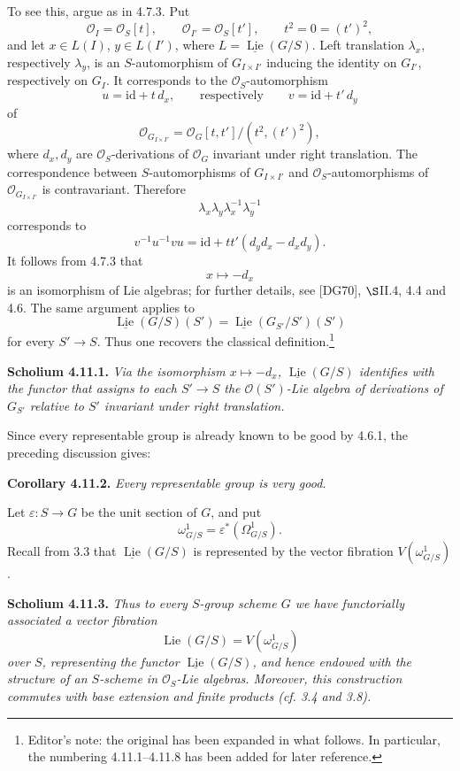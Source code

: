 To see this, argue as in 4.7.3. Put
\[
 \mathcal O_I=\mathcal O_S[t],
 \qquad
 \mathcal O_{I'}=\mathcal O_S[t'],
 \qquad
 t^2=0=(t')^2,
\]
and let \(x\in L(I)\), \(y\in L(I')\), where
\(L=\underline{\operatorname{Lie}}(G/S)\). Left translation
\(\lambda_x\), respectively \(\lambda_y\), is an \(S\)-automorphism
of \(G_{I\times I'}\) inducing the identity on \(G_{I'}\),
respectively on \(G_I\). It corresponds to the
\(\mathcal O_S\)-automorphism
\[
 u=\mathrm{id}+t\,d_x,
 \qquad\text{respectively}\qquad
 v=\mathrm{id}+t'\,d_y
\]
of
\[
 \mathcal O_{G_{I\times I'}}
 =\mathcal O_G[t,t']/(t^2,(t')^2),
\]
where \(d_x,d_y\) are \(\mathcal O_S\)-derivations of
\(\mathcal O_G\) invariant under right translation. The
correspondence between \(S\)-automorphisms of \(G_{I\times I'}\)
and \(\mathcal O_S\)-automorphisms of
\(\mathcal O_{G_{I\times I'}}\) is contravariant. Therefore
\[
 \lambda_x\lambda_y\lambda_x^{-1}\lambda_y^{-1}
\]
corresponds to
\[
 v^{-1}u^{-1}vu
 =\mathrm{id}+tt'(d_yd_x-d_xd_y).
\]
It follows from 4.7.3 that
\[
 x\longmapsto-d_x
\]
is an isomorphism of Lie algebras; for further details, see [DG70],
\(\S\)II.4, 4.4 and 4.6. The same argument applies to
\[
 \underline{\operatorname{Lie}}(G/S)(S')
 =
 \underline{\operatorname{Lie}}(G_{S'}/S')(S')
\]
for every \(S'\to S\). Thus one recovers the classical
definition.\footnote{Editor's note: the original has been expanded in
what follows. In particular, the numbering 4.11.1--4.11.8 has been
added for later reference.}

\medskip
\noindent\textbf{Scholium 4.11.1.}
\textit{Via the isomorphism \(x\mapsto-d_x\),
\(\underline{\operatorname{Lie}}(G/S)\) identifies with the functor
that assigns to each \(S'\to S\) the \(\mathcal O(S')\)-Lie algebra
of derivations of \(G_{S'}\) relative to \(S'\) invariant under right
translation.}

Since every representable group is already known to be good by
4.6.1, the preceding discussion gives:

\medskip
\noindent\textbf{Corollary 4.11.2.}
\textit{Every representable group is very good.}

Let \(\varepsilon:S\to G\) be the unit section of \(G\), and put
\[
 \omega^1_{G/S}=\varepsilon^*(\Omega^1_{G/S}).
\]
Recall from 3.3 that
\(\underline{\operatorname{Lie}}(G/S)\) is represented by the vector
fibration \(V(\omega^1_{G/S})\).

\medskip
\noindent\textbf{Scholium 4.11.3.}
\textit{Thus to every \(S\)-group scheme \(G\) we have functorially
associated a vector fibration}
\[
 \operatorname{Lie}(G/S)=V(\omega^1_{G/S})
\]
\textit{over \(S\), representing the functor
\(\underline{\operatorname{Lie}}(G/S)\), and hence endowed with the
structure of an \(S\)-scheme in \(\mathcal O_S\)-Lie algebras.
Moreover, this construction commutes with base extension and finite
products (cf. 3.4 and 3.8).}


